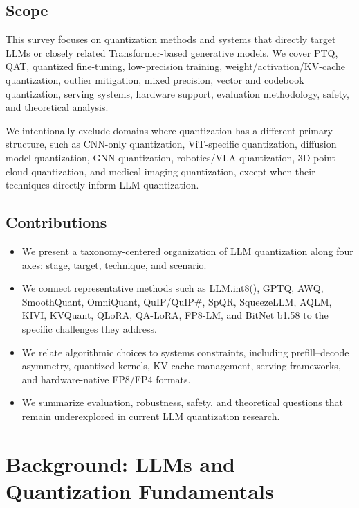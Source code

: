 \documentclass[journal,10pt]{IEEEtran}
\begin{document}
\subsection{Scope}
This survey focuses on quantization methods and systems that directly target LLMs or closely related Transformer-based generative models. We cover PTQ, QAT, quantized fine-tuning, low-precision training, weight/activation/KV-cache quantization, outlier mitigation, mixed precision, vector and codebook quantization, serving systems, hardware support, evaluation methodology, safety, and theoretical analysis.

We intentionally exclude domains where quantization has a different primary structure, such as CNN-only quantization, ViT-specific quantization, diffusion model quantization, GNN quantization, robotics/VLA quantization, 3D point cloud quantization, and medical imaging quantization, except when their techniques directly inform LLM quantization.

\subsection{Contributions}
\begin{itemize}[leftmargin=*,nosep]
  \item We present a taxonomy-centered organization of LLM quantization along four axes: stage, target, technique, and scenario.
  \item We connect representative methods such as LLM.int8(), GPTQ, AWQ, SmoothQuant, OmniQuant, QuIP/QuIP\#, SpQR, SqueezeLLM, AQLM, KIVI, KVQuant, QLoRA, QA-LoRA, FP8-LM, and BitNet b1.58 to the specific challenges they address.
  \item We relate algorithmic choices to systems constraints, including prefill--decode asymmetry, quantized kernels, KV cache management, serving frameworks, and hardware-native FP8/FP4 formats.
  \item We summarize evaluation, robustness, safety, and theoretical questions that remain underexplored in current LLM quantization research.
\end{itemize}

\section{Background: LLMs and Quantization Fundamentals}
\end{document}
